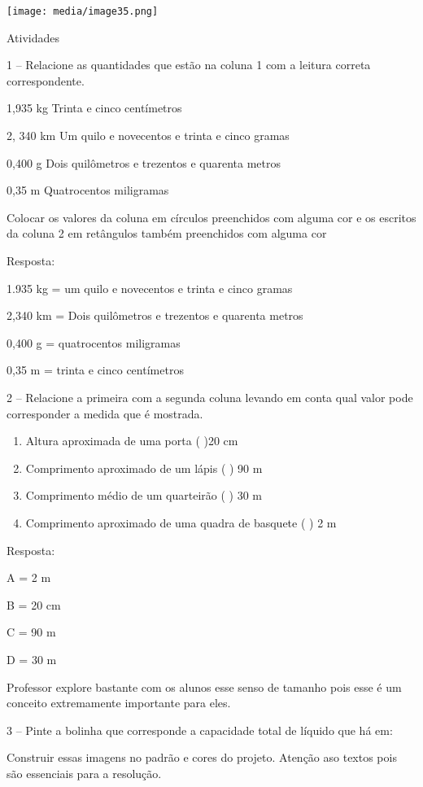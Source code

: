 \texttt{[image: media/image35.png]}

Atividades

1 -- Relacione as quantidades que estão na coluna 1 com a leitura
correta correspondente.

1,935 kg Trinta e cinco centímetros

2, 340 km Um quilo e novecentos e trinta e cinco gramas

0,400 g Dois quilômetros e trezentos e quarenta metros

0,35 m Quatrocentos miligramas

Colocar os valores da coluna em círculos preenchidos com alguma cor e os
escritos da coluna 2 em retângulos também preenchidos com alguma cor

Resposta:

1.935 kg = um quilo e novecentos e trinta e cinco gramas

2,340 km = Dois quilômetros e trezentos e quarenta metros

0,400 g = quatrocentos miligramas

0,35 m = trinta e cinco centímetros

2 -- Relacione a primeira com a segunda coluna levando em conta qual
valor pode corresponder a medida que é mostrada.

\begin{enumerate}
\def\labelenumi{(\Alph{enumi})}
\item
  Altura aproximada de uma porta ( )20 cm
\item
  Comprimento aproximado de um lápis ( ) 90 m
\item
  Comprimento médio de um quarteirão ( ) 30 m
\item
  Comprimento aproximado de uma quadra de basquete ( ) 2 m
\end{enumerate}

Resposta:

A = 2 m

B = 20 cm

C = 90 m

D = 30 m

Professor explore bastante com os alunos esse senso de tamanho pois esse
é um conceito extremamente importante para eles.

3 -- Pinte a bolinha que corresponde a capacidade total de líquido que
há em:

Construir essas imagens no padrão e cores do projeto. Atenção aso textos
pois são essenciais para a resolução.

